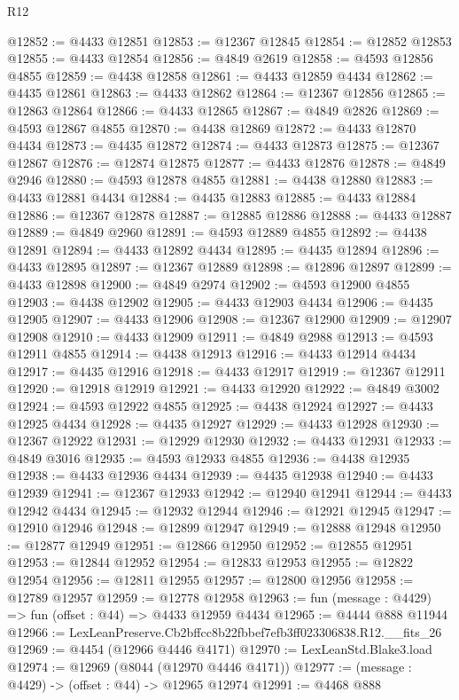 \begin{lexlean}{R12}
\begin{coremodule}
@12852 := @4433 @12851
@12853 := @12367 @12845
@12854 := @12852 @12853
@12855 := @4433 @12854
@12856 := @4849 @2619
@12858 := @4593 @12856 @4855
@12859 := @4438 @12858
@12861 := @4433 @12859 @4434
@12862 := @4435 @12861
@12863 := @4433 @12862
@12864 := @12367 @12856
@12865 := @12863 @12864
@12866 := @4433 @12865
@12867 := @4849 @2826
@12869 := @4593 @12867 @4855
@12870 := @4438 @12869
@12872 := @4433 @12870 @4434
@12873 := @4435 @12872
@12874 := @4433 @12873
@12875 := @12367 @12867
@12876 := @12874 @12875
@12877 := @4433 @12876
@12878 := @4849 @2946
@12880 := @4593 @12878 @4855
@12881 := @4438 @12880
@12883 := @4433 @12881 @4434
@12884 := @4435 @12883
@12885 := @4433 @12884
@12886 := @12367 @12878
@12887 := @12885 @12886
@12888 := @4433 @12887
@12889 := @4849 @2960
@12891 := @4593 @12889 @4855
@12892 := @4438 @12891
@12894 := @4433 @12892 @4434
@12895 := @4435 @12894
@12896 := @4433 @12895
@12897 := @12367 @12889
@12898 := @12896 @12897
@12899 := @4433 @12898
@12900 := @4849 @2974
@12902 := @4593 @12900 @4855
@12903 := @4438 @12902
@12905 := @4433 @12903 @4434
@12906 := @4435 @12905
@12907 := @4433 @12906
@12908 := @12367 @12900
@12909 := @12907 @12908
@12910 := @4433 @12909
@12911 := @4849 @2988
@12913 := @4593 @12911 @4855
@12914 := @4438 @12913
@12916 := @4433 @12914 @4434
@12917 := @4435 @12916
@12918 := @4433 @12917
@12919 := @12367 @12911
@12920 := @12918 @12919
@12921 := @4433 @12920
@12922 := @4849 @3002
@12924 := @4593 @12922 @4855
@12925 := @4438 @12924
@12927 := @4433 @12925 @4434
@12928 := @4435 @12927
@12929 := @4433 @12928
@12930 := @12367 @12922
@12931 := @12929 @12930
@12932 := @4433 @12931
@12933 := @4849 @3016
@12935 := @4593 @12933 @4855
@12936 := @4438 @12935
@12938 := @4433 @12936 @4434
@12939 := @4435 @12938
@12940 := @4433 @12939
@12941 := @12367 @12933
@12942 := @12940 @12941
@12944 := @4433 @12942 @4434
@12945 := @12932 @12944
@12946 := @12921 @12945
@12947 := @12910 @12946
@12948 := @12899 @12947
@12949 := @12888 @12948
@12950 := @12877 @12949
@12951 := @12866 @12950
@12952 := @12855 @12951
@12953 := @12844 @12952
@12954 := @12833 @12953
@12955 := @12822 @12954
@12956 := @12811 @12955
@12957 := @12800 @12956
@12958 := @12789 @12957
@12959 := @12778 @12958
@12963 := fun (message : @4429) => fun (offset : @44) => @4433 @12959 @4434
@12965 := @4444 @888 @11944
@12966 := LexLeanPreserve.Cb2bffcc8b22fbbef7efb3ff023306838.R12.__fits_26
@12969 := @4454 (@12966 @4446 @4171)
@12970 := LexLeanStd.Blake3.load
@12974 := @12969 (@8044 (@12970 @4446 @4171))
@12977 := (message : @4429) -> (offset : @44) -> @12965 @12974
@12991 := @4468
    @888

\end{coremodule}
\end{lexlean}
